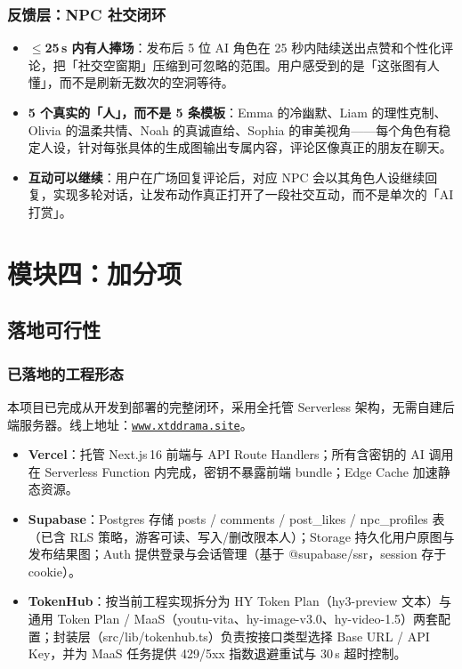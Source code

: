 \documentclass[10pt, a4paper]{article}
\newcommand{\kw}[1]{\textbf{#1}}
\newcommand{\code}[1]{{\small\ttfamily #1}}
\newcommand{\model}[1]{{\small\ttfamily\color{TokenPurple}#1}}
\begin{document}
\subsubsection*{反馈层：NPC 社交闭环}

\begin{itemize}[leftmargin=2em, itemsep=0.3em, topsep=3pt]
  \item \kw{$\leq$25\,s 内有人捧场}：发布后 5 位 AI 角色在 25 秒内陆续送出点赞和个性化评论，把「社交空窗期」压缩到可忽略的范围。用户感受到的是「这张图有人懂」，而不是刷新无数次的空洞等待。
  \item \kw{5 个真实的「人」，而不是 5 条模板}：Emma 的冷幽默、Liam 的理性克制、Olivia 的温柔共情、Noah 的真诚直给、Sophia 的审美视角——每个角色有稳定人设，针对每张具体的生成图输出专属内容，评论区像真正的朋友在聊天。
  \item \kw{互动可以继续}：用户在广场回复评论后，对应 NPC 会以其角色人设继续回复，实现多轮对话，让发布动作真正打开了一段社交互动，而不是单次的「AI 打赏」。
\end{itemize}

\section{模块四：加分项}

\subsection{落地可行性}

\subsubsection*{已落地的工程形态}

本项目已完成从开发到部署的完整闭环，采用全托管 Serverless 架构，无需自建后端服务器。线上地址：\href{https://www.xtddrama.site/}{\texttt{www.xtddrama.site}}。

\vspace{3pt}
\begin{itemize}[leftmargin=2em, itemsep=0.25em, topsep=3pt]
  \item \kw{Vercel}：托管 Next.js\,16 前端与 API Route Handlers；所有含密钥的 AI 调用在 Serverless Function 内完成，密钥不暴露前端 bundle；Edge Cache 加速静态资源。

  \item \kw{Supabase}：Postgres 存储 posts / comments / post\_likes / npc\_profiles 表（已含 RLS 策略，游客可读、写入/删改限本人）；Storage 持久化用户原图与发布结果图；Auth 提供登录与会话管理（基于 \code{@supabase/ssr}，session 存于 cookie）。

  \item \kw{TokenHub}：按当前工程实现拆分为 HY Token Plan（\model{hy3-preview} 文本）与通用 Token Plan / MaaS（\model{youtu-vita}、\model{hy-image-v3.0}、\model{hy-video-1.5}）两套配置；封装层（\code{src/lib/tokenhub.ts}）负责按接口类型选择 Base URL / API Key，并为 MaaS 任务提供 429/5xx 指数退避重试与 30\,s 超时控制。
\end{itemize}
\end{document}
